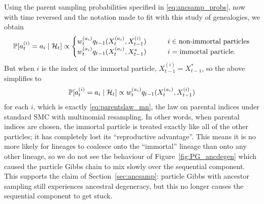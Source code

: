 Using the parent sampling probabilities specified in \eqref{eq:ancsamp_probs},
now with time reversed and the notation made to fit  with this study of genealogies, we obtain
\begin{equation*}
\mathbb{P}[a_t^{(i)} = a_i \mid \mathcal{H}_t ] \propto
\begin{cases}
w_t^{(a_i)} q_{t-1}(X_t^{(a_i)}, X_{t-1}^{(i)}) &\qquad i\in\text{non-immortal particles}\\
w_t^{(a_i)} q_{t-1}(X_t^{(a_i)}, X_{t-1}^*) &\qquad i=\text{immortal particle} .
\end{cases} 
\end{equation*}
But when $i$ is the index of the immortal particle, $X_{t-1}^{(i)} = X_{t-1}^*$, so the above simplifies to
\begin{equation*}
\mathbb{P}[a_t^{(i)} = a_i \mid \mathcal{H}_t ] \propto
w_t^{(a_i)} q_{t-1}(X_t^{(a_i)}, X_{t-1}^{(i)})
\end{equation*}
for each $i$, which is exactly \eqref{eq:parentslaw_mn}, the law on parental indices under standard SMC with multinomial resampling.
In other words, when parental indices are chosen, the immortal particle is treated exactly like all of the other particles; it has completely lost its ``reproductive advantage''.
This means it is no more likely for lineages to coalesce onto the ``immortal'' lineage than onto any other lineage, so we do not see the behaviour of Figure~\ref{fig:PG_ancdegen} which caused the particle Gibbs chain to mix slowly over the sequential component.
This supports the claim of Section~\ref{sec:ancsamp}: particle Gibbs with ancestor sampling still experiences ancestral degeneracy, but this no longer causes the sequential component to get stuck.


